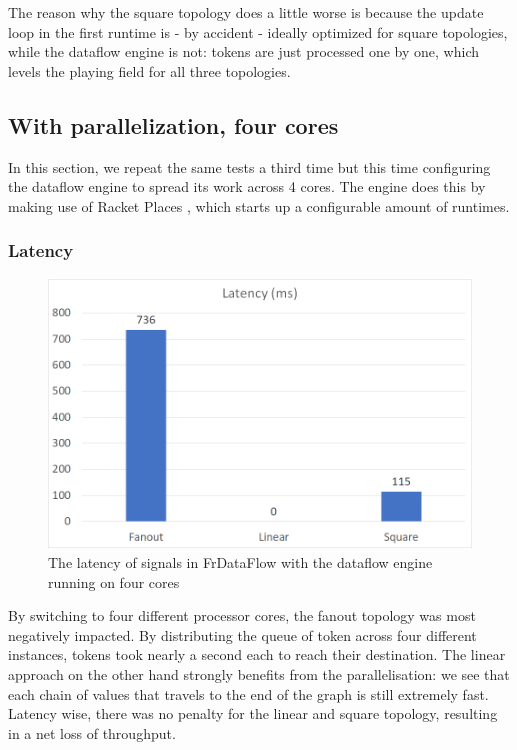 The reason why the square topology does a little worse is because the update loop in the first runtime is - by accident - ideally optimized for square topologies, while the dataflow engine is not: tokens are just processed one by one, which levels the playing field for all three topologies. 

\subsection{With parallelization, four cores}

In this section, we repeat the same tests a third time but this time configuring the dataflow engine to spread its work across 4 cores. The engine does this by making use of Racket Places \cite{tew_places:_2011}, which starts up a configurable amount of runtimes. 

\subsubsection{Latency}

\begin{figure}[h]
	\includegraphics[width=\textwidth]{images/Evaluation-WithDataFlowParallel-Latency.png}
	\caption{The latency of signals in FrDataFlow with the dataflow engine running on four cores}
	\label{fig:evaluation-withdataflow-latency}
\end{figure}

By switching to four different processor cores, the fanout topology was most negatively impacted. By distributing the queue of token across four different instances, tokens took nearly a second each to reach their destination. 
The linear approach on the other hand strongly benefits from the parallelisation: we see that each chain of values that travels to the end of the graph is still extremely fast. Latency wise, there was no penalty for the linear and square topology, resulting in a net loss of throughput.

